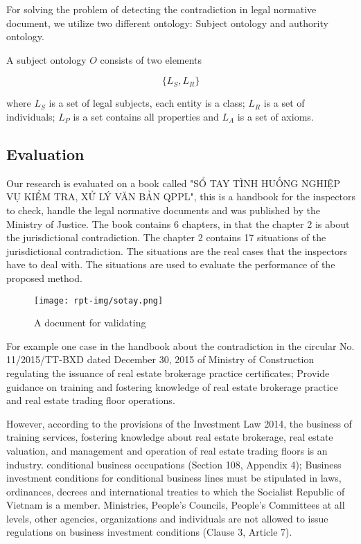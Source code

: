 For solving the problem of detecting the contradiction in legal normative document, we utilize two different ontology: Subject ontology and authority ontology.

\begin{definition}
    A subject ontology $O$ consists of two elements 
    
    $$\{L_S, L_R \}$$
    
    where $L_S$ is a set of legal subjects, each entity is a class; $L_R$ is a set of individuals; $L_P$ is a set contains all properties and $L_A$ is a set of axioms.
\end{definition}

\subsection{Evaluation}

Our research is evaluated on a book called "SỔ TAY TÌNH HUỐNG NGHIỆP VỤ KIỂM TRA, XỬ LÝ VĂN BẢN QPPL", this is a handbook for the inspectors to check, handle the legal normative documents and was published by the Ministry of Justice. The book contains 6 chapters, in that the chapter 2 is about the jurisdictional contradiction. The chapter 2 contains 17 situations of the jurisdictional contradiction. The situations are the real cases that the inspectors have to deal with. The situations are used to evaluate the performance of the proposed method.

\begin{figure}[H]
\centering
\texttt{[image: rpt-img/sotay.png]}
\caption{A document for validating}
\label{fig:docex}
\end{figure}

For example one case in the handbook about the contradiction in the circular No. 11/2015/TT-BXD dated December 30, 2015 of Ministry of Construction regulating the issuance of real estate brokerage practice certificates; Provide guidance on training and fostering knowledge of real estate brokerage practice and real estate trading floor operations.

However, according to the provisions of the Investment Law 2014, the business of training services, fostering knowledge about real estate brokerage, real estate valuation, and management and operation of real estate trading floors is an industry. conditional business occupations (Section 108, Appendix 4); Business investment conditions for conditional business lines must be stipulated in laws, ordinances, decrees and international treaties to which the Socialist Republic of Vietnam is a member. Ministries, People's Councils, People's Committees at all levels, other agencies, organizations and individuals are not allowed to issue regulations on business investment conditions (Clause 3, Article 7). 

